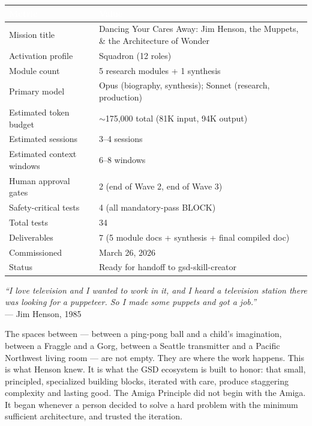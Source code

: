 \documentclass[11pt,letterpaper]{article}
\newcommand{\tableheader}[1]{\textbf{\sffamily\textcolor{white}{#1}}}
\begin{document}
\begin{center}
\begin{tabularx}{\textwidth}{L{4cm}X}
\toprule
{}
\tableheader{Metric} & \tableheader{Value} \\
\midrule
Mission title & Dancing Your Cares Away: Jim Henson, the Muppets, \& the Architecture of Wonder \\
Activation profile & Squadron (12 roles) \\
Module count & 5 research modules + 1 synthesis \\
Primary model & Opus (biography, synthesis); Sonnet (research, production) \\
Estimated token budget & $\sim$175,000 total (81K input, 94K output) \\
Estimated sessions & 3--4 sessions \\
Estimated context windows & 6--8 windows \\
Human approval gates & 2 (end of Wave 2, end of Wave 3) \\
Safety-critical tests & 4 (all mandatory-pass BLOCK) \\
Total tests & 34 \\
Deliverables & 7 (5 module docs + synthesis + final compiled doc) \\
Commissioned & March 26, 2026 \\
Status & Ready for handoff to gsd-skill-creator \\
\bottomrule
\end{tabularx}
\end{center}

\vspace{2em}

\begin{quotebox}
\textit{``I love television and I wanted to work in it, and I heard a television station there was looking for a puppeteer. So I made some puppets and got a job.''} \\[0.5em]
--- Jim Henson, 1985

\vspace{0.8em}
\noindent The spaces between --- between a ping-pong ball and a child's imagination, between a Fraggle and a Gorg, between a Seattle transmitter and a Pacific Northwest living room --- are not empty. They are where the work happens. This is what Henson knew. It is what the GSD ecosystem is built to honor: that small, principled, specialized building blocks, iterated with care, produce staggering complexity and lasting good. The Amiga Principle did not begin with the Amiga. It began whenever a person decided to solve a hard problem with the minimum sufficient architecture, and trusted the iteration.
\end{quotebox}
\end{document}

